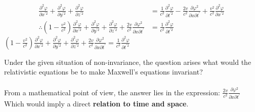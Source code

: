 \documentclass[letterpaper]{article}
\begin{document}
\begin{align*}
\frac{\partial^2\varphi}{\partial x^{\prime 2}} +
\frac{\partial^2\varphi}{\partial y^{\prime 2}} +
\frac{\partial^2\varphi}{\partial z^{\prime 2}} &=
\frac{1}{c^2}\frac{\partial^2\varphi}{\partial t^{\prime 2}}
-\frac{2v}{c^2}\frac{\partial\varphi^2}{\partial x \partial t^\prime}
+\frac{v^2}{c^2}\frac{\partial^2\varphi}{\partial x^{\prime 2}}
\\\therefore
(1-\frac{v^2}{c^2})\frac{\partial^2\varphi}{\partial x^{\prime 2}} +
\frac{\partial^2\varphi}{\partial y^{\prime 2}} +
\frac{\partial^2\varphi}{\partial z^{\prime 2}} +
\frac{2v}{c^2}\frac{\partial\varphi^2}{\partial x \partial t^\prime}
&= \frac{1}{c^2}\frac{\partial^2\varphi}{\partial t^{\prime 2}}
\end{align*}
$
\boxed{
(1-\frac{v^2}{c^2})\frac{\partial^2\varphi}{\partial x^{\prime 2}} +
\frac{\partial^2\varphi}{\partial y^{\prime 2}} +
\frac{\partial^2\varphi}{\partial z^{\prime 2}} +
\frac{2v}{c^2}\frac{\partial\varphi^2}{\partial x \partial t^\prime}
= \frac{1}{c^2}\frac{\partial^2\varphi}{\partial t^{\prime 2}}}
$
\\
\begin{center}
\end{center}
Under the given situation of non-invariance, the question arises what
would the relativistic equations be to make Maxwell's equations
invariant?\\\\
From a mathematical point of view, the answer lies in the expression:
$
\boxed{
\frac{2v}{c^2}\frac{\partial\varphi^2}{\partial x \partial t^\prime}}
$
Which would imply a direct \textbf{relation to time and space}.
\end{document}
